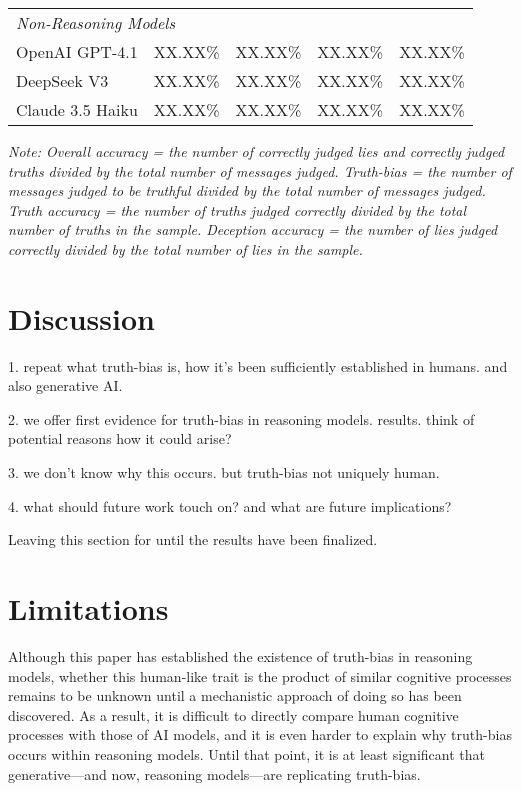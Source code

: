 \documentclass{article}
\begin{document}
\begin{table}[ht]
\begin{tabular}{lcccc}
\midrule
\multicolumn{5}{l}{\textit{Non-Reasoning Models}} \\
OpenAI GPT-4.1 & XX.XX\% & XX.XX\% & XX.XX\% & XX.XX\% \\
DeepSeek V3 & XX.XX\% & XX.XX\% & XX.XX\% & XX.XX\% \\
Claude 3.5 Haiku & XX.XX\% & XX.XX\% & XX.XX\% & XX.XX\% \\
\bottomrule
\end{tabular}
\label{tab:model_performance}
\footnotetext{}
\parbox[t]{\linewidth}{\footnotesize \textit{Note: Overall accuracy = the number of correctly judged lies and correctly judged truths divided by the total number of messages judged. Truth-bias = the number of messages judged to be truthful divided by the total number of messages judged. Truth accuracy = the number of truths judged correctly divided by the total number of truths in the sample. Deception accuracy = the number of lies judged correctly divided by the total number of lies in the sample.}}
\end{table}

\section{Discussion}

1. repeat what truth-bias is, how it's been sufficiently established in humans. and also generative AI.

2. we offer first evidence for truth-bias in reasoning models. results. think of potential reasons how it could arise?

3. we don't know why this occurs. but truth-bias not uniquely human.

4. what should future work touch on? and what are future implications?

Leaving this section for until the results have been finalized.

\section{Limitations}

Although this paper has established the existence of truth-bias in reasoning models, whether this human-like trait is the product of similar cognitive processes remains to be unknown until a mechanistic approach of doing so has been discovered. As a result, it is difficult to directly compare human cognitive processes with those of AI models, and it is even harder to explain why truth-bias occurs within reasoning models. Until that point, it is at least significant that generative---and now, reasoning models---are replicating truth-bias.
\end{document}
